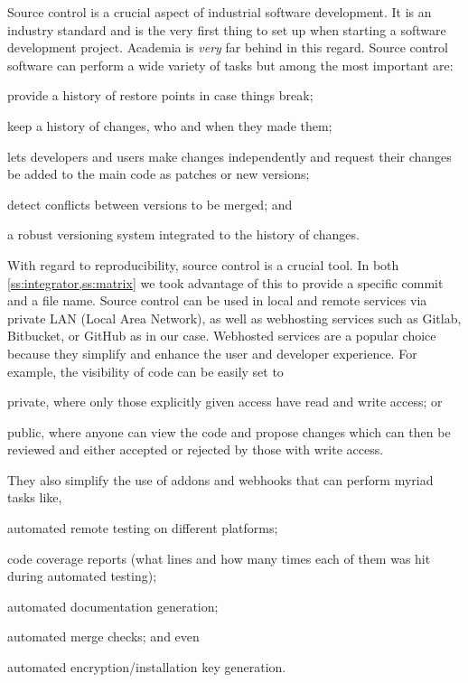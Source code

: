 Source control is a crucial aspect of industrial software development. It is an industry standard and is the very first thing to set up when starting a software development project. Academia is \emph{very} far behind in this regard. Source control software can perform a wide variety of tasks but among the most important are:
\begin{inparaenum}
    \item provide a history of restore points in case things break;
    \item keep a history of changes, who and when they made them;
    \item lets developers and users make changes independently and request their changes be added to the main code as patches or new versions;
    \item detect conflicts between versions to be merged; and
    \item a robust versioning system integrated to the history of changes.
\end{inparaenum}

With regard to reproducibility, source control is a crucial tool. In both \cref{ss:integrator,ss:matrix} we took advantage of this to provide a specific commit and a file name. Source control can be used in local and remote services via private LAN (Local Area Network), as well as webhosting services such as Gitlab, Bitbucket, or GitHub as in our case. Webhosted services are a popular choice because they simplify and enhance the user and developer experience. For example, the visibility of code can be easily set to
\begin{inparaenum}
    \item private, where only those explicitly given access have read and write access; or
    \item public, where anyone can view the code and propose changes which can then be reviewed and either accepted or rejected by those with write access.
\end{inparaenum}
They also simplify the use of addons and webhooks that can perform myriad tasks like,
\begin{inparaenum}
    \item automated remote testing on different platforms;
    \item code coverage reports (what lines and how many times each of them was hit during automated testing);
    \item automated documentation generation;
    \item automated merge checks; and even
    \item automated encryption/installation key generation.
\end{inparaenum}


